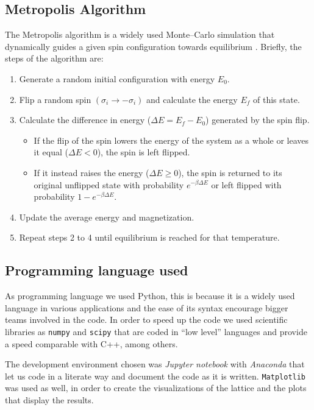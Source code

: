 \documentclass[
    10pt,
    journal,
    compsoc,
    english
]{IEEEtran}
\begin{document}
\subsection{Metropolis Algorithm}
The Metropolis algorithm is a widely used Monte--Carlo simulation that dynamically guides a given spin configuration towards equilibrium \cite{metropolis}. Briefly, the steps of the algorithm are:
\begin{enumerate}
    \item Generate a random initial configuration with energy $E_0$.
    \item Flip a random spin $(\sigma_i \to -\sigma_i)$ and calculate the energy $E_f$ of this state.
    \item Calculate the difference in energy ($\Delta E = E_f - E_0$) generated by the spin flip.
    \begin{itemize}
        \item If the flip of the spin lowers the energy of the system as a whole or leaves it equal ($\Delta E < 0$), the spin is left flipped.
        \item If it instead raises the energy ($\Delta E \geq 0$), the spin is returned to its original unflipped state with probability $e^{-\beta\Delta E}$ or left flipped with probability $1 - e^{-\beta\Delta E}$.
    \end{itemize}
    \item Update the average energy and magnetization.
    \item Repeat steps 2 to 4 until equilibrium is reached for that temperature.
\end{enumerate}

\subsection{Programming language used}
As programming language we used Python, this is because it is a widely used language in various applications and the ease of its syntax encourage bigger teams involved in the code. In order to speed up the code we used scientific libraries as \texttt{numpy} and \texttt{scipy} that are coded in ``low level'' languages and provide a speed comparable with C++, among others.

The development environment chosen was \textit{Jupyter notebook} with \textit{Anaconda} that let us code in a literate way and document the code as it is written. \texttt{Matplotlib} was used as well, in order to create the visualizations of the lattice and the plots that display the results.
\end{document}

